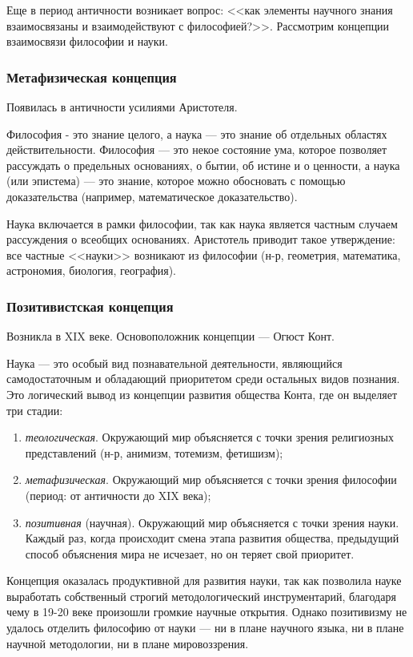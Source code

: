 Еще в период античности возникает вопрос: <<как элементы научного знания взаимосвязаны и взаимодействуют с философией?>>. Рассмотрим концепции взаимосвязи философии и науки.

\subsubsection{Метафизическая концепция}

Появилась в античности усилиями Аристотеля.

Философия - это знание целого, а наука — это знание об отдельных областях действительности.
Философия — это некое состояние ума, которое позволяет рассуждать о предельных основаниях, о бытии, об истине и о ценности, а наука (или эпистема) — это знание, которое можно обосновать с помощью доказательства (например, математическое доказательство). 

Наука включается в рамки философии, так как наука является частным случаем рассуждения о всеобщих основаниях.
Аристотель приводит такое утверждение: все частные <<науки>> возникают из философии (н-р, геометрия, математика, астрономия, биология, география).

\subsubsection{Позитивистская концепция}

Возникла в XIX веке. Основоположник концепции — Огюст Конт. 

Наука — это особый вид познавательной деятельности, являющийся самодостаточным и обладающий приоритетом среди остальных видов познания. 
Это логический вывод из концепции развития общества Конта, где он выделяет три стадии: 
\begin{enumerate}
    \item \textit{теологическая}. Окружающий мир объясняется с точки зрения религиозных представлений (н-р, анимизм, тотемизм, фетишизм);
    \item \textit{метафизическая}. Окружающий мир объясняется с точки зрения философии (период: от античности до XIX века);
    \item \textit{позитивная} (научная). Окружающий мир объясняется с точки зрения науки.
Каждый раз, когда происходит смена этапа развития общества, предыдущий способ объяснения мира не исчезает, но он теряет свой приоритет.
\end{enumerate}

Концепция оказалась продуктивной для развития науки, так как позволила науке выработать собственный строгий методологический инструментарий, благодаря чему в 19-20 веке произошли громкие научные открытия. 
Однако позитивизму не удалось отделить философию от науки — ни в плане научного языка, ни в плане научной методологии, ни в плане мировоззрения. 

